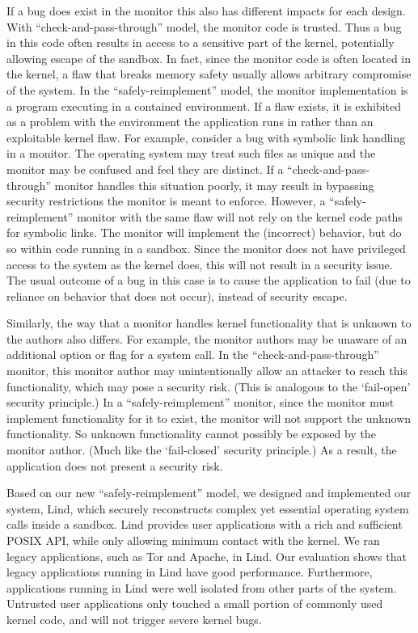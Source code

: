 \par
If a bug does exist in the monitor this also has different impacts for each
design. With ``check-and-pass-through'' model, the monitor code is trusted.
Thus a bug in this code often results in access to a sensitive part of the
kernel, potentially allowing escape of the sandbox. In fact, since the
monitor code is often located in the kernel, a flaw that breaks memory
safety usually allows arbitrary compromise of the system. In the
``safely-reimplement'' model, the monitor implementation is a program
executing in a contained environment. If a flaw exists, it is exhibited as
a problem with the environment the application runs in rather than an
exploitable kernel flaw. For example, consider a bug with symbolic link
handling in a monitor. The operating system may treat such files as unique
and the monitor may be confused and feel they are distinct. If a
``check-and-pass-through'' monitor handles this situation poorly, it may
result in bypassing security restrictions the monitor is meant to enforce.
However, a ``safely-reimplement'' monitor with the same flaw will not rely
on the kernel code paths for symbolic links. The monitor will implement the
(incorrect) behavior, but do so within code running in a sandbox. Since the
monitor does not have privileged access to the system as the kernel does,
this will not result in a security issue. The usual outcome of a bug in
this case is to cause the application to fail (due to reliance on behavior
that does not occur), instead of security escape.


\par
Similarly, the way that a monitor handles kernel functionality that is
unknown to the authors also differs. For example, the monitor authors may
be unaware of an additional option or flag for a system call. In the
``check-and-pass-through'' monitor, this monitor author may unintentionally
allow an attacker to reach this functionality, which may pose a security
risk. (This is analogous to the `fail-open' security principle.)  In a
``safely-reimplement'' monitor, since the monitor must implement
functionality for it to exist, the monitor will not support the unknown
functionality. So unknown functionality cannot possibly be exposed by the
monitor author. (Much like the `fail-closed' security principle.) As a
result, the application does not present a security risk.


\par
Based on our new ``safely-reimplement'' model, we designed and implemented
our system, Lind, which securely reconstructs complex yet essential
operating system calls inside a sandbox. Lind provides user applications
with a rich and sufficient POSIX API, while only allowing minimum contact
with the kernel. We ran legacy applications, such as Tor and Apache, in
Lind. Our evaluation shows that legacy applications running in Lind have
good performance. Furthermore, applications running in Lind were well
isolated from other parts of the system. Untrusted user applications only
touched a small portion of commonly used kernel code, and will not trigger
severe kernel bugs.


